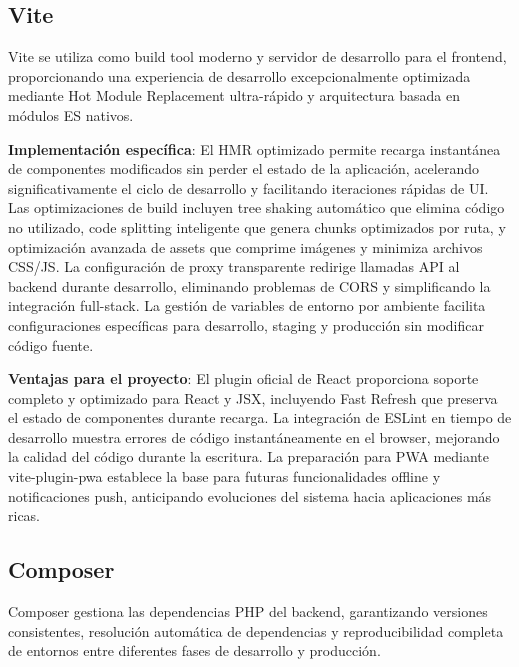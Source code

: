 \documentclass[12pt,a4paper,oneside]{report}
\begin{document}
\subsection{Vite}\label{vite}

Vite se utiliza como build tool moderno y servidor de desarrollo para el frontend, proporcionando una experiencia de desarrollo excepcionalmente optimizada mediante Hot Module Replacement ultra-rápido y arquitectura basada en módulos ES nativos.

\textbf{Implementación específica}: El HMR optimizado permite recarga instantánea de componentes modificados sin perder el estado de la aplicación, acelerando significativamente el ciclo de desarrollo y facilitando iteraciones rápidas de UI. Las optimizaciones de build incluyen tree shaking automático que elimina código no utilizado, code splitting inteligente que genera chunks optimizados por ruta, y optimización avanzada de assets que comprime imágenes y minimiza archivos CSS/JS. La configuración de proxy transparente redirige llamadas API al backend durante desarrollo, eliminando problemas de CORS y simplificando la integración full-stack. La gestión de variables de entorno por ambiente facilita configuraciones específicas para desarrollo, staging y producción sin modificar código fuente.

\textbf{Ventajas para el proyecto}: El plugin oficial de React proporciona soporte completo y optimizado para React y JSX, incluyendo Fast Refresh que preserva el estado de componentes durante recarga. La integración de ESLint en tiempo de desarrollo muestra errores de código instantáneamente en el browser, mejorando la calidad del código durante la escritura. La preparación para PWA mediante vite-plugin-pwa establece la base para futuras funcionalidades offline y notificaciones push, anticipando evoluciones del sistema hacia aplicaciones más ricas.

\subsection{Composer}\label{composer}

Composer gestiona las dependencias PHP del backend, garantizando versiones consistentes, resolución automática de dependencias y reproducibilidad completa de entornos entre diferentes fases de desarrollo y producción.
\end{document}
